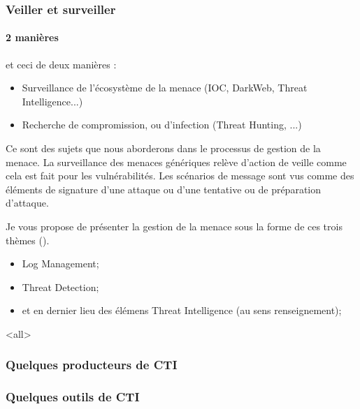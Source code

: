 \begin{frame}
\frametitle<presentation>{Veiller et surveiller}
\framesubtitle<presentation>{2 manières}

et ceci de deux manières :

\begin{itemize}
  \item Surveillance de l'écosystème de la menace (IOC,  DarkWeb, Threat Intelligence...) 
  \item Recherche de compromission, ou d'infection (Threat Hunting, ...) 
\end{itemize}
\end{frame}

Ce sont des sujets que nous aborderons dans le processus de gestion de la menace.
La surveillance des menaces génériques relève d'action de veille comme cela est fait pour les vulnérabilités. Les scénarios de message sont vus comme des éléments de signature d'une attaque ou d'une tentative ou de préparation  d'attaque.

Je vous propose de présenter  la gestion de la menace sous la forme de ces trois thèmes  ().

\begin{itemize}
  \item Log Management;
  \item Threat Detection;
 \item  et en dernier lieu des élémens Threat Intelligence (au sens renseignement);
\end{itemize}

\mode<all>{}

\subsubsection{Quelques producteurs de CTI}

\subsubsection{Quelques outils de CTI}



